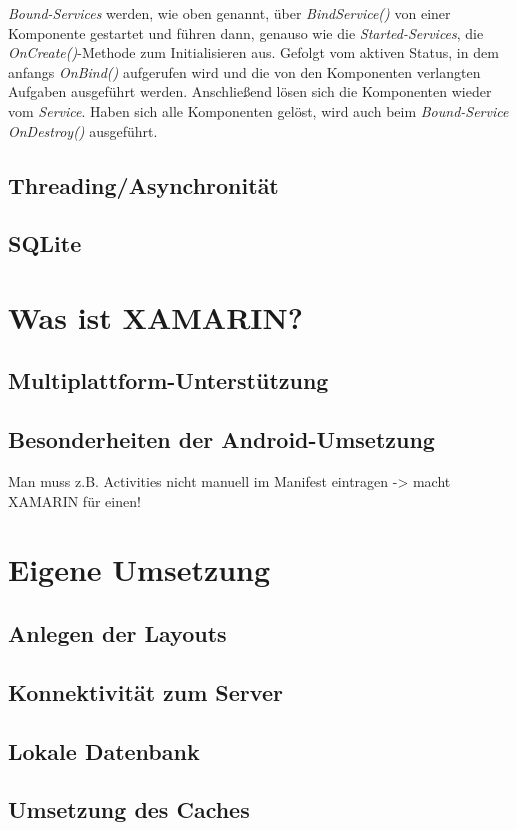 \textit{Bound-Services} werden, wie oben genannt, über \textit{BindService()} von einer Komponente gestartet und führen dann, genauso wie die \textit{Started-Services}, die \textit{OnCreate()}-Methode zum Initialisieren aus. Gefolgt vom aktiven Status, in dem anfangs \textit{OnBind()} aufgerufen wird und die von den Komponenten verlangten Aufgaben ausgeführt werden. Anschließend lösen sich die Komponenten wieder vom \textit{Service}. Haben sich alle Komponenten gelöst, wird auch beim \textit{Bound-Service} \textit{OnDestroy()} ausgeführt.


\subsection{Threading/Asynchronität}
\label{ssec:android-threading-async}

\subsection{SQLite}
\label{ssec:android-sqlite}

\section{Was ist XAMARIN?}
\label{sec:defintion-xamarin}

\subsection{Multiplattform-Unterstützung}
\label{ssec:xamarin-multiplattform}

\subsection{Besonderheiten der Android-Umsetzung}
\label{ssec:xamarin-android}
Man muss z.B. Activities nicht manuell im Manifest eintragen -> macht XAMARIN für einen!

\section{Eigene Umsetzung}
\label{sec:nat-umsetzung}

\subsection{Anlegen der Layouts}
\label{ssec:nat-layouts}

\subsection{Konnektivität zum Server}
\label{ssec:nat-konnektivität}

\subsection{Lokale Datenbank}
\label{ssec:nat-db}

\subsection{Umsetzung des Caches}
\label{ssec:nat-cache}
